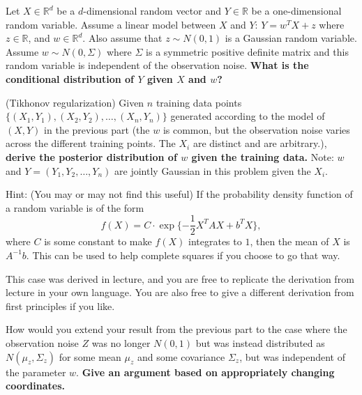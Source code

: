 \begin{Parts}
\Part  Let $X \in \mathbb{R}^d$ be a $d$-dimensional random vector and
$Y \in \mathbb{R}$ be a one-dimensional random variable. Assume a
linear model between $X$ and $Y$: $Y=w^TX+z$ where $z\in\mathbb{R}$,
and $w\in\mathbb{R}^d$. Also assume that $z \sim N(0,1)$ is a Gaussian
random variable. Assume $w\sim N(0,\Sigma)$ where $\Sigma$ is a
symmetric positive definite matrix and this random variable is independent of the
observation noise. {\bf What is the conditional distribution of $Y$ given $X$ and $w$?}



\Part (Tikhonov regularization)  Given $n$ training data points
$\{(X_1,Y_1),(X_2,Y_2),\ldots, (X_n,Y_n)\}$ generated according to the
model of $(X,Y)$ in the previous part (the $w$ is common, but the
observation noise varies across the different training points. The $X_i$ are
distinct and are arbitrary.), {\bf derive the posterior distribution of $w$
given the training data.} Note: $w$ and $Y = (Y_1, Y_2, \ldots, Y_n)$ are jointly Gaussian in this
problem given the $X_i$. 

Hint: (You may or may not find this useful) If the probability density function of a random variable is of the form
\begin{equation} 
f(X)=C \cdot\exp\{-\frac{1}{2}X^TAX+b^TX\}, 
\end{equation}
where $C$ is some constant to make $f(X)$ integrates to $1$, then the mean of $X$ is 
$A^{-1}b$. This can be used to help complete squares if you choose to
go that way.

This case was derived in lecture, and you are free to replicate the
derivation from lecture in your own language. You are also free to
give a different derivation from first principles if you like.



 How would you extend your result from
the previous part to the case where the observation noise $Z$ was no
longer $N(0, 1)$ but was instead distributed as $N(\mu_z, \Sigma_z)$ for
some mean $\mu_z$ and some covariance $\Sigma_z$, but was independent
of the parameter $w$. {\bf Give an argument based on appropriately
  changing coordinates.}



\end{Parts}
